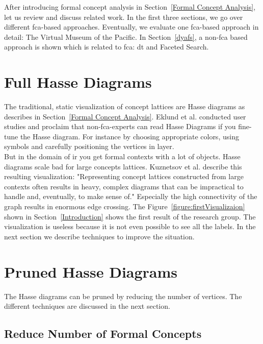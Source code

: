 \documentclass[11pt]{report}
\begin{document}
After introducing formal concept analysis in Section~\ref{Formal Concept Analysis}, let us review and discuss related work. In the first three sections, we go over different \acrshort{fca}-based approaches. Eventually, we evaluate one \acrshort{fca}-based approach in detail: The Virtual Museum of the Pacific. In Section~\ref{dyafs}, a non-\acrshort{fca} based approach is shown which is related to \acrshort{fca}: \acrshort{dt} and Faceted Search. \\

\section{Full Hasse Diagrams}

The traditional, static visualization of concept lattices are Hasse diagrams as describes in Section~\ref{Formal Concept Analysis}. Eklund et al. \cite{Eklund2004} conducted user studies and proclaim that non-\acrshort{fca}-experts can read Hasse Diagrams if you fine-tune the Hasse diagram. For instance by choosing appropriate colors, using symbols and carefully positioning the vertices in layer. \\

But in the domain of \acrshort{ir} you get formal contexts with a lot of objects. Hasse diagrams scale bad for large concepts lattices. Kuznetsov et al. \cite{Kuznetsov20072}  describe this resulting visualization: "Representing concept lattices constructed from large contexts often results in heavy, complex diagrams that can be impractical to handle and, eventually, to make sense of." Especially the high connectivity of the graph results in enormous edge crossing. The Figure~\ref{figure:firstVisualizaion} shown in Section~\ref{Introduction} shows the first result of the research group. The visualization is useless because it is not even possible to see all the labels. In the next section we describe techniques to improve the situation.

\section{Pruned Hasse Diagrams}

The Hasse diagrams can be pruned by reducing the number of vertices. The different techniques are discussed in the next section.

\subsection{Reduce Number of Formal Concepts}
\end{document}
